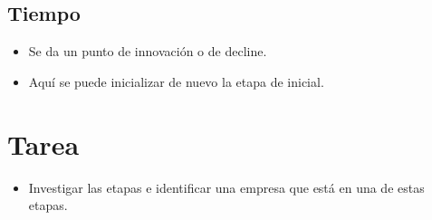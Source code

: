 \subsection{Tiempo}
\begin{itemize}
    \item Se da un punto de innovación o de decline.
    \item Aquí se puede inicializar de nuevo la etapa de inicial.
\end{itemize}





\section*{Tarea}
\begin{itemize}
    \item Investigar las etapas e identificar una empresa que está en una de estas etapas.
\end{itemize}   

